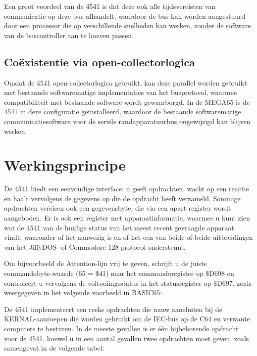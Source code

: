Een groot voordeel van de 4541 is dat deze ook alle tijdsvereisten van communicatie op deze bus afhandelt, waardoor de bus kan worden aangestuurd door een processor die op verschillende snelheden kan werken, zonder de software van de buscontroller aan te hoeven passen.

\subsection{Coëxistentie via open-collectorlogica}

Omdat de 4541 open-collectorlogica gebruikt, kan deze parallel worden gebruikt met bestaande softwarematige implementaties van het busprotocol, waarmee compatibiliteit met bestaande software wordt gewaarborgd. In de MEGA65 is de 4541 in deze configuratie geïnstalleerd, waardoor de bestaande softwarematige communicatiesoftware voor de seriële randapparatuurbus ongewijzigd kan blijven werken.

\section{Werkingsprincipe}

De 4541 biedt een eenvoudige interface: u geeft opdrachten, wacht op een reactie en haalt vervolgens de gegevens op die de opdracht heeft verzameld. Sommige opdrachten vereisen ook een gegevensbyte, die via een apart register wordt aangeboden. Er is ook een register met apparaatinformatie, waarmee u kunt zien wat de 4541 van de huidige status van het meest recent gevraagde apparaat vindt, waaronder of het aanwezig is en of het een van beide of beide uitbreidingen van het JiffyDOS{\texttrademark}- of Commodore{\texttrademark} 128-protocol ondersteunt.

Om bijvoorbeeld de Attention-lijn vrij te geven, schrijft u de juiste commandobyte-waarde (65 = \$41) naar het commandoregister op \$D698 en controleert u vervolgens de voltooiingsstatus in het statusregister op \$D697, zoals weergegeven in het volgende voorbeeld in BASIC65:


De 4541 implementeert een reeks opdrachten die nauw aansluiten bij de KERNAL-aanroepen die worden gebruikt om de IEC-bus op de C64 en verwante computers te besturen. In de meeste gevallen is er één bijbehorende opdracht voor de 4541, hoewel u in een aantal gevallen twee opdrachten moet geven, zoals samengevat in de volgende tabel:

